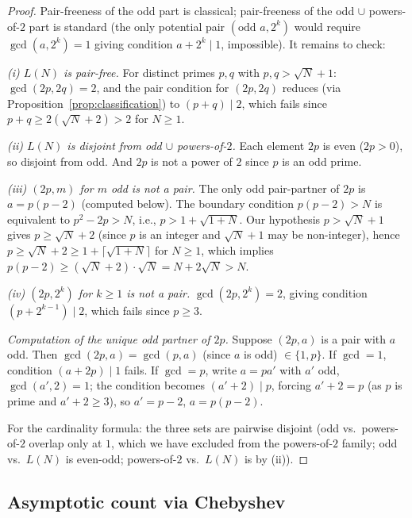 \documentclass[11pt]{amsart}
\theoremstyle{plain}
\theoremstyle{definition}
\begin{document}
\begin{proof}
Pair-freeness of the odd part is classical; pair-freeness of the odd $\cup$ powers-of-$2$ part is standard (the only potential pair $(\text{odd } a, 2^k)$ would require $\gcd(a, 2^k) = 1$ giving condition $a + 2^k \mid 1$, impossible). It remains to check:

\emph{(i) $L(N)$ is pair-free.} For distinct primes $p, q$ with $p, q > \sqrt{N} + 1$: $\gcd(2p, 2q) = 2$, and the pair condition for $(2p, 2q)$ reduces (via Proposition~\ref{prop:classification}) to $(p + q) \mid 2$, which fails since $p + q \geq 2(\sqrt{N} + 2) > 2$ for $N \geq 1$.

\emph{(ii) $L(N)$ is disjoint from odd $\cup$ powers-of-$2$.} Each element $2p$ is even ($2p > 0$), so disjoint from odd. And $2p$ is not a power of $2$ since $p$ is an odd prime.

\emph{(iii) $(2p, m)$ for $m$ odd is not a pair.} The only odd pair-partner of $2p$ is $a = p(p - 2)$ (computed below). The boundary condition $p(p - 2) > N$ is equivalent to $p^2 - 2p > N$, i.e., $p > 1 + \sqrt{1 + N}$. Our hypothesis $p > \sqrt{N} + 1$ gives $p \geq \sqrt{N} + 2$ (since $p$ is an integer and $\sqrt{N} + 1$ may be non-integer), hence $p \geq \sqrt{N} + 2 \geq 1 + \lceil \sqrt{1+N} \rceil$ for $N \geq 1$, which implies $p(p - 2) \geq (\sqrt{N} + 2) \cdot \sqrt{N} = N + 2\sqrt{N} > N$.

\emph{(iv) $(2p, 2^k)$ for $k \geq 1$ is not a pair.} $\gcd(2p, 2^k) = 2$, giving condition $(p + 2^{k-1}) \mid 2$, which fails since $p \geq 3$.

\emph{Computation of the unique odd partner of $2p$.} Suppose $(2p, a)$ is a pair with $a$ odd. Then $\gcd(2p, a) = \gcd(p, a)$ (since $a$ is odd) $\in \{1, p\}$. If $\gcd = 1$, condition $(a + 2p) \mid 1$ fails. If $\gcd = p$, write $a = p a'$ with $a'$ odd, $\gcd(a', 2) = 1$; the condition becomes $(a' + 2) \mid p$, forcing $a' + 2 = p$ (as $p$ is prime and $a' + 2 \geq 3$), so $a' = p - 2$, $a = p(p-2)$.

For the cardinality formula: the three sets are pairwise disjoint (odd vs.\ powers-of-$2$ overlap only at $1$, which we have excluded from the powers-of-$2$ family; odd vs.\ $L(N)$ is even-odd; powers-of-$2$ vs.\ $L(N)$ is by (ii)).
\end{proof}

\subsection{Asymptotic count via Chebyshev}
\end{document}
